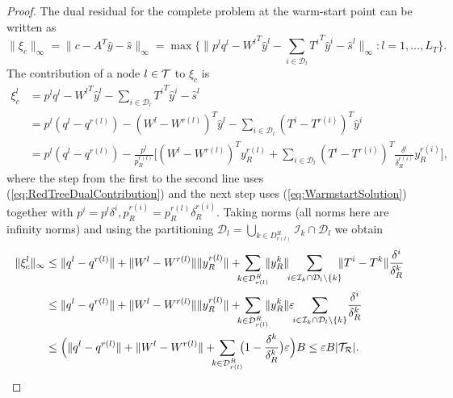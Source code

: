 \begin{proof}
The dual residual for the complete problem at the warm-start point 
can be written as
\[
  \|\xi_c\|_\infty = \|c -A^T\hat y -\hat s \|_\infty 
                   = \max\{\|p^{l}q^{l}
                   - {W^{l}}^T\hat y^{l} 
                   - \sum_{i \in \mathcal{D}_{l}} {T^{i}}^T\hat y^{i}
                   - \hat s^{l}
  \|_\infty : l = 1,\ldots,L_T\}.
\]
%
The contribution of a node $l \in \mathcal{T}$ to $\xi_c$ is
\[
\begin{split}
  \xi_c^{l} 
 & = p^{l} q^{l} - {W^{l}}^T\hat y^{l}
     - \sum_{i\in \mathcal{D}_{l}} {T^i}^T \!\hat y^{i} -\hat s^{l} \\
 & = p^{l}(q^{l}\!-\! q^{r(l)})
     - (W^{l} \!-\! W^{r(l)})^T \hat y^{l}
     -\sum_{i \in \mathcal{D}_{l}} (T^{i} \!-\! T^{r(i)})^T\hat y^i \\
 & = p^{l}(q^{l} \!-\! q^{r(l)})
     - \frac{p^{l}}{p^{r(l)}_R} \Big[
       (W^{l} \!-\! W^{r(l)})^T y^{r(l)}_R
       +\sum_{i\in \mathcal{D}_{l}} %
           (T^{i} \!-\! T^{r(i)})^T 
           \frac{\delta^i}{\delta^{r(i)}_R} y^{r(i)}_R \Big],
\end{split}
\]
where the step from the first to the second line uses 
(\ref{eq:RedTreeDualContribution}) and the next step uses
(\ref{eq:WarmstartSolution}) together with $p^i = p^l\delta^i,
p_R^{r(i)} = p_R^{r(l)}\delta_R^{r(i)}$.
%
Taking norms (all norms here are infinity norms)
and using the partitioning 
$\mathcal{D}_l = \bigcup_{k\in D^R_{r(l)}} \mathcal{I}_k\cap\mathcal{D}_l$
we obtain
\[
\begin{split}
  \| \xi_c^{l} \|_\infty
  & \le \|q^{l} - q^{r(l)}\| 
        + \|W^{l} - W^{r(l)}\| \| y^{r(l)}_R\|
        + \!\!\! \sum_{k\in \mathcal{D}_{r(l)}^R} \!\!\! \| y^{k}_R \| \!\!
          \sum_{i\in \mathcal{I}_k \cap \mathcal{D}_{l}\setminus \{k\} }
	  \!\!\! \| T^{i} - T^{k} \| \frac{\delta^i}{\delta_R^k} \\
  & \le \|q^{l} - q^{r(l)}\| 
        + \|W^{l} - W^{r(l)}\| \| y^{r(l)}_R\|
        + \!\!\! \sum_{k\in \mathcal{D}_{r(l)}^R} \!\!\! \| y^{k}_R \|
          \varepsilon \!\!
          \sum_{i\in \mathcal{I}_k \cap \mathcal{D}_{l}\setminus \{k\} }
	  \! \frac{\delta^i}{\delta_R^k} \\
  & \le \Big( \|q^{l} - q^{r(l)}\| 
        + \|W^{l} - W^{r(l)}\|
        + \!\!\! \sum_{k\in \mathcal{D}_{r(l)}^R} \!\!\!
	  \big( 1 - \frac{\delta^k}{\delta_R^k} \big) \varepsilon \Big) B
    \le \varepsilon B |\Rtree|.
        \qedhere
\end{split}
\]
%
\end{proof}

